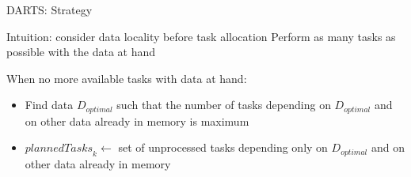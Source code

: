 \documentclass{libs/ufc_format}
\newcommand{\GPU}[1]{\ensuremath{\mathrm{GPU}_{#1}}\xspace}
\newcommand{\Dtouse}[1]{\ensuremath{\mathit{dataNotInMem}_{#1}}\xspace}
\newcommand{\plannedTasks}[1]{\ensuremath{\mathit{plannedTasks}_{#1}}\xspace}
\newcommand{\Dopt}{\ensuremath{D_{\mathit{opt}}}\xspace}
\newcommand{\Treturned}{\ensuremath{T}\xspace}
\newcommand{\pulledTasks}[1]{\ensuremath{\mathit{taskBuffer}_{#1}}\xspace}
\begin{document}

\begin{frame}{DARTS: Strategy}
	\begin{alertblock}{Intuition: consider data locality before task allocation}
		Perform as many tasks as possible with the data at hand
	\end{alertblock}
	
	When no more available tasks with data at hand:
	
	\begin{alertblock}{}
		\begin{itemize}
			\item Find data $D_{optimal}$ such that the number of tasks depending on $D_{optimal}$ and on other data already in memory is maximum
			\item $\plannedTasks{k} \gets$ set of unprocessed tasks depending only on $D_{optimal}$ and on other data already in memory 
		\end{itemize}
	\end{alertblock}
\end{frame}
\end{document}
